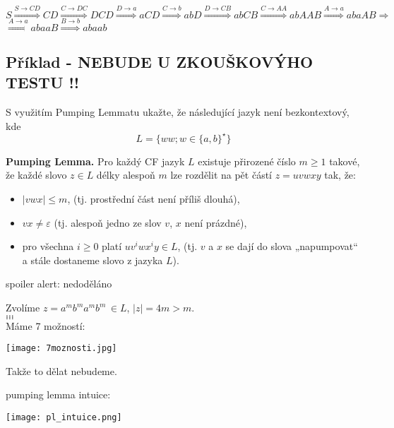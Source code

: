 $S \stackrel{S \rightarrow CD}{\Longrightarrow} CD \stackrel{C \rightarrow DC}{\Longrightarrow} DCD \stackrel
{D \rightarrow a}{\Longrightarrow} aCD \stackrel{C \rightarrow b}{\Longrightarrow} abD \stackrel{D \rightarrow CB}
{\Longrightarrow} abCB \stackrel{C \rightarrow AA}{\Longrightarrow} abAAB \stackrel{A \rightarrow a}{\Longrightarrow} 
abaAB \Longrightarrow $\\
$\stackrel{A \rightarrow a}{\Longrightarrow} abaaB \stackrel{B \rightarrow b}{\Longrightarrow} abaab$

\subsection{Příklad - NEBUDE U ZKOUŠKOVÝHO TESTU !!}

S využitím Pumping Lemmatu ukažte, že následující jazyk není bezkontextový, kde $$L = \{ww; w \in\{a,b\}^{\star}\}$$


\textbf{Pumping Lemma.} Pro každý CF jazyk $L$ existuje přirozené číslo $m \geq 1$ takové, že každé slovo $z \in L$ 
délky alespoň $m$ lze rozdělit na pět částí $z = uvwxy$ tak, že:

\begin{itemize}[label=\textbullet]
    \item $\lvert vwx \rvert \leq m$, (tj. prostřední část není příliš dlouhá),
    \item $vx \neq \varepsilon$ (tj. alespoň jedno ze slov $v$, $x$ není prázdné),
    \item pro všechna $i \geq 0$ platí $uv^i wx^i y \in L$, (tj. $v$ a $x$ se dají do slova „napumpovat“ a stále 
    dostaneme slovo z jazyka $L$).
\end{itemize}

spoiler alert: nedoděláno 

Zvolíme $z = a^m b^m a^m b^m \, \in L$, $|z| = 4m > m$. \\ 
$\dots$\\
$\dots$\\
$\dots$\\

Máme 7 možností: 
\begin{center}
    \texttt{[image: 7moznosti.jpg]}
\end{center}
Takže to dělat nebudeme. 

pumping lemma intuice: 
\begin{center}
    \texttt{[image: pl\_intuice.png]}
\end{center}

